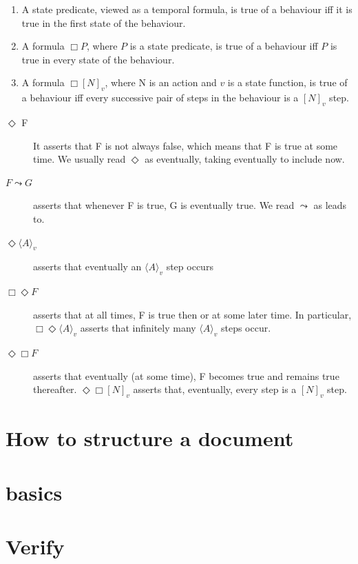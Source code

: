 \begin{enumerate}
	\item  A state predicate, viewed as a temporal formula, is true of a behaviour iff it is true in the first state of the behaviour.
	\item  A formula \( \Box P \), where \(P\) is a state predicate, is true of a behaviour iff \( P \) is true in every state of the behaviour.
	\item  A formula \( \Box[N]_{v} \), where N is an action and \(v\) is a state function, is true of a behaviour iff 
		every successive pair of steps in the behaviour is a \( [N]_v \) step.
\end{enumerate}


\begin{description}
	\item [\( \Diamond \) F ] It asserts that F is not always false, which means that F is true at some time.
		We usually read \( \Diamond \) as eventually, taking eventually to include now.
	\item [ \( F \leadsto G \) ] asserts that whenever F is true, G is eventually true.
		We read \( \leadsto \) as leads to.
	\item [\(  \Diamond \langle A \rangle_v \) ] asserts that eventually an \( \langle A \rangle_v \) step occurs
	\item [ \( \Box \Diamond F \) ] asserts that at all times, F is true then or at some later time.
		In particular,\( \Box \Diamond \langle A \rangle_v \) asserts that infinitely many \( \langle A \rangle_v \) steps occur.
	\item [ \( \Diamond \Box F \) ] asserts that eventually (at some time), F becomes true and remains true thereafter.
		\( \Diamond \Box [N]_v \) asserts that, eventually, every step is a \([N]_v\) step.
\end{description}



\section{How to structure a document}

\section{basics}

\section{Verify}